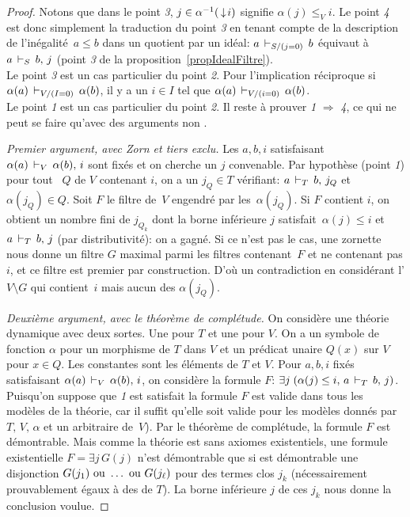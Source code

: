 \begin{proof} Notons que dans le point \emph{3}, $j\in \alpha^{-1}(\,\downarrow\! i)$ signifie  $\alpha(j)\leq_V i$.
Le point \emph{4} est donc simplement la traduction du point \emph{3} en tenant compte de la description de l'inégalité~\hbox{$a\leq b$} dans un quotient par un idéal: $a\,\vdash_{S/(j=0)}\,b$ équivaut à $a\,\vdash_{S}\,b,\,j$ (point \emph{3} de la proposition~\ref{propIdealFiltre}).
\\
Le point \emph{3} est un cas particulier du point \emph{2}. Pour l'implication réciproque si $\alpha(a)\,\vdash_{V/(I=0)}\,\alpha(b)$, il y a un $i\in I$ tel que
$\alpha(a)\,\vdash_{V/(i=0)}\,\alpha(b)$. 
\\
Le point \emph{1} est un cas particulier du point \emph{2}.
Il reste à prouver \emph{1} $\Rightarrow$ \emph{4}, ce qui ne peut se faire qu'avec des arguments non \cofs. 

\smallskip \noindent \emph{Premier argument, avec Zorn et tiers exclu.}
Les \elts $a,b,i$ satisfaisant $\alpha(a)\,\vdash_{V}\, \alpha(b),\,i$ sont fixés et on cherche un $j$ convenable. Par hypothèse (point \emph{1}) pour tout \idep~$Q$ de $V$ contenant $i$, on a un $j_Q\in T$ vérifiant: $a\,\vdash_{T}\, b,\,j_Q$ et $\alpha(j_Q)\in Q$. Soit $F$ le filtre de~$V$ engendré par les~$\alpha(j_Q)$. Si $F$ contient $i$, on obtient un nombre fini de $j_{Q_k}$ dont la borne inférieure  $j$ satisfait~\hbox{$\alpha(j)\leq i$} et $a\,\vdash_{T}\, b,\,j$ (par distributivité): on a gagné.
Si ce n'est pas le cas, une zornette nous donne un filtre $G$ maximal parmi les filtres contenant~$F$ et ne contenant pas $i$, et ce filtre est premier par construction. D'où un contradiction en considérant l'\idep $V\setminus G$
qui contient~$i$ mais aucun des $\alpha(j_Q)$.  

\smallskip \noindent \emph{Deuxième argument, avec le théorème de complétude.} On considère une théorie dynamique avec deux sortes. Une pour  $T$ et une pour $V$. On a un symbole de fonction $\alpha$ pour un morphisme de $T$ dans $V$ et un prédicat unaire $Q(x)$ sur $V$ pour $x\in Q$. Les constantes sont les éléments de $T$ et $V$. Pour $a,b,i$ fixés satisfaisant 
$\alpha(a)\,\vdash_{V}\, \alpha(b),\,i$, on considère la formule $F$: $\exists j\;(\alpha(j)\leq i,\, a\,\vdash_{T}\, b,\,j)$. Puisqu'on suppose que \emph{1} est satisfait
la formule $F$ est valide dans tous les modèles de la théorie, car il suffit qu'elle soit valide pour les modèles donnés par $T,\,V,\,\alpha$ et un \idep arbitraire de~$V$). Par le théorème de complétude, la formule $F$ est démontrable.
Mais comme la théorie est sans axiomes existentiels, une formule existentielle $F= \exists j \,G(j)$ n'est démontrable que si est démontrable une disjonction $G(j_1) \hbox{ ou } \dots \hbox{ ou }G(j_\ell)$ pour des termes clos $j_k$ (nécessairement prouvablement égaux à des \elts de $T$). La borne inférieure $j$ de ces $j_k$ nous donne la conclusion voulue.   
\end{proof}
%

